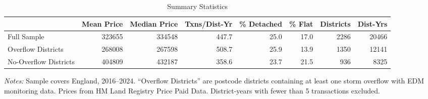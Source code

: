 \begin{table}[htbp]
\centering
\caption{Summary Statistics}
\label{tab:summary}
\begin{adjustbox}{max width=\textwidth}
\begin{tabular}{lrrrrrrr}
\toprule
 & Mean Price & Median Price & Txns/Dist-Yr & \% Detached & \% Flat & Districts & Dist-Yrs \\
\midrule
Full Sample & 323655 & 334548 & 447.7 & 25.0 & 17.0 & 2286 & 20466 \\
Overflow Districts & 268008 & 267598 & 508.7 & 25.9 & 13.9 & 1350 & 12141 \\
No-Overflow Districts & 404809 & 432187 & 358.6 & 23.7 & 21.5 & 936 & 8325 \\
\bottomrule
\end{tabular}
\end{adjustbox}
\begin{tablenotes}[flushleft]\small
\item \textit{Notes:} Sample covers England, 2016--2024. ``Overflow Districts'' are postcode districts containing at least one storm overflow with EDM monitoring data. Prices from HM Land Registry Price Paid Data. District-years with fewer than 5 transactions excluded.
\end{tablenotes}
\end{table}

